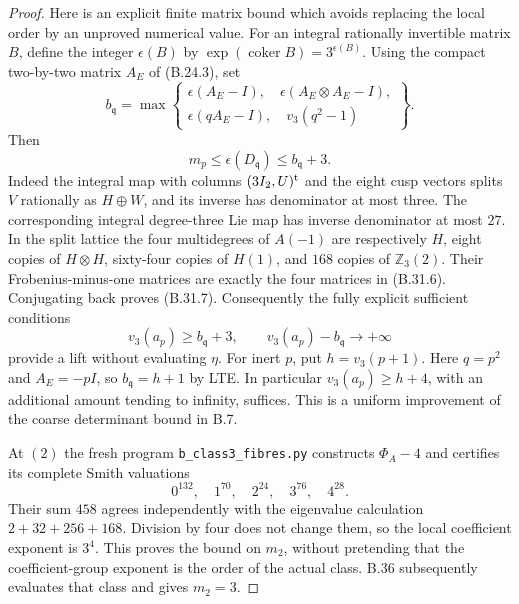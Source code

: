 \begin{proof}
Here is an explicit finite matrix bound which avoids
replacing the local order by an unproved numerical value.
For an integral rationally invertible matrix $B$, define
the integer $\epsilon(B)$ by
$\operatorname{exp}(\operatorname{coker}B)=3^{\epsilon(B)}$.
Using the compact two-by-two matrix $A_E$ of (B.24.3), set
\[
 b_{\mathfrak q}=\max\left\{
 \begin{array}{l}
 \epsilon(A_E-I),\quad\epsilon(A_E\otimes A_E-I),\\
 \epsilon(qA_E-I),\quad v_3(q^2-1)
 \end{array}\right\}.
                                                               \tag{B.31.6}
\]
Then
\[
        m_p\le\epsilon(D_{\mathfrak q})
                    \le b_{\mathfrak q}+3.                    \tag{B.31.7}
\]
Indeed the integral map with columns $(3I_2,U)^{\rm t}$
and the eight cusp vectors splits $V$ rationally as
$H\oplus W$, and its inverse has denominator at most three.
The corresponding integral degree-three Lie map has
inverse denominator at most $27$.
In the split lattice the four multidegrees of $A(-1)$
are respectively $H$, eight copies of $H\otimes H$,
sixty-four copies of $H(1)$, and $168$ copies of
$\mathbb Z_3(2)$. Their Frobenius-minus-one matrices
are exactly the four matrices in (B.31.6).
Conjugating back proves (B.31.7).
Consequently the fully explicit sufficient conditions
\[
 v_3(a_p)\ge b_{\mathfrak q}+3,
 \qquad v_3(a_p)-b_{\mathfrak q}\longrightarrow+\infty
                                                               \tag{B.31.8}
\]
provide a lift without evaluating $\eta$.
For inert $p$, put $h=v_3(p+1)$. Here $q=p^2$ and
$A_E=-pI$, so $b_{\mathfrak q}=h+1$ by LTE.
In particular $v_3(a_p)\ge h+4$, with an additional
amount tending to infinity, suffices. This is a uniform
improvement of the coarse determinant bound in B.7.

At $(2)$ the fresh program \texttt{b\_class3\_fibres.py}
constructs $\Phi_A-4$ and certifies its complete Smith
valuations
\[
              0^{132},\quad1^{70},\quad2^{24},\quad3^{76},\quad4^{28}.
                                                               \tag{B.31.9}
\]
Their sum $458$ agrees independently with the eigenvalue
calculation $2+32+256+168$. Division by four does not
change them, so the local coefficient exponent is $3^4$.
This proves the bound on $m_2$, without pretending that the
coefficient-group exponent is the order of the actual class.
B.36 subsequently evaluates that class and gives $m_2=3$.


\end{proof}
